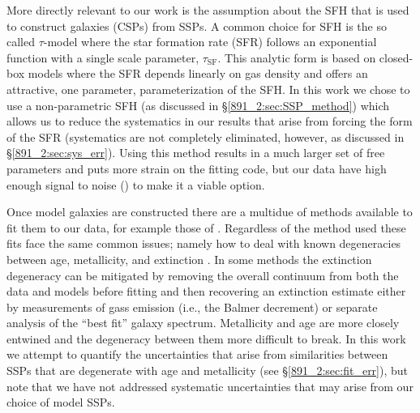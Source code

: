 More directly relevant to our work is the assumption about the SFH
that is used to construct galaxies (CSPs) from SSPs. A common choice
for SFH is the so called $\tau$-model where the star formation rate
(SFR) follows an exponential function with a single scale parameter,
$\tau_\mathrm{SF}$. This analytic form is based on closed-box models
where the SFR depends linearly on gas density \citep{Schmidt59} and
offers an attractive, one parameter, parameterization of the SFH. In
this work we chose to use a non-parametric SFH (as discussed in
\S\ref{891_2:sec:SSP_method}) which allows us to reduce the systematics in
our results that arise from forcing the form of the SFR (systematics
are not completely eliminated, however, as discussed in
\S\ref{891_2:sec:sys_err}). Using this method results in a much larger set
of free parameters and puts more strain on the fitting code, but our
data have high enough signal to noise () to
make it a viable option.

Once model galaxies are constructed there are a multidue of methods
available to fit them to our data, for example those of
\citep{Cappellari04,Tojeiro07,Chen12,CidFernandes05,Ocvirk06,Wilkinson15,Sanchez16}. Regardless
of the method used these fits face the same common issues; namely how
to deal with known degeneracies between age, metallicity, and
extinction \citep{Oconnel76,Aaronson78,Worthey94,dePaz02}. In some
methods the extinction degeneracy can be mitigated by removing the
overall continuum from both the data and models before fitting
\citep[e.g.,][]{Ocvirk06,Wilkinson15} and then recovering an
extinction estimate either by measurements of gass emission (i.e., the
Balmer decrement) or separate analysis of the ``best fit'' galaxy
spectrum. Metallicity and age are more closely entwined and the
degeneracy between them more difficult to break. In this work we
attempt to quantify the uncertainties that arise from similarities
between SSPs that are degenerate with age and metallicity (see
\S\ref{891_2:sec:fit_err}), but note that we have not addressed systematic
uncertainties that may arise from our choice of model SSPs.




